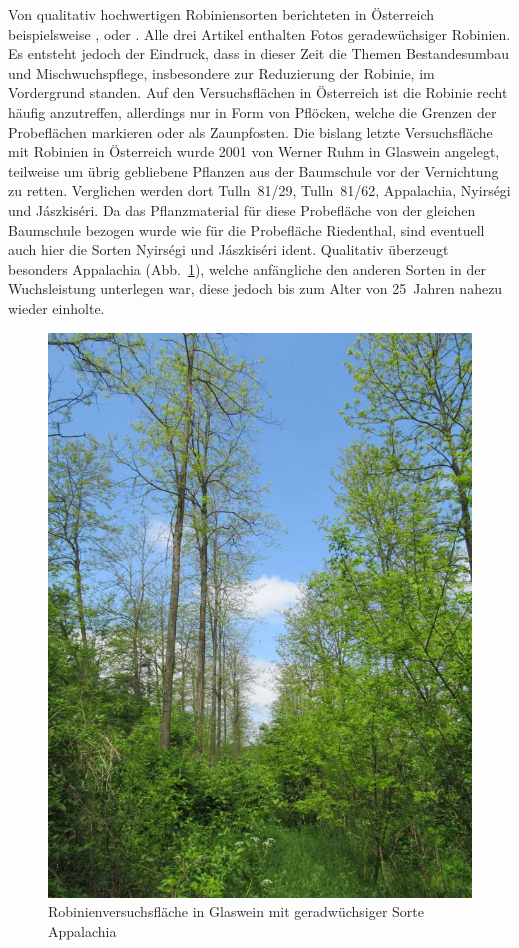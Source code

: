 \documentclass[twocolumn]{scrartcl}
\begin{document}
Von qualitativ hochwertigen Robiniensorten berichteten in Österreich
beispielsweise \citet{mueller1991robinie}, \citet{iby1998robinie} oder
\citet{demel2004robinie}. Alle drei Artikel enthalten Fotos
geradewüchsiger Robinien. Es entsteht jedoch der Eindruck, dass in
dieser Zeit die Themen Bestandesumbau und Mischwuchspflege,
insbesondere zur Reduzierung der Robinie, im Vordergrund standen.
Auf den Versuchsflächen in Österreich ist die Robinie recht
häufig anzutreffen, allerdings nur in Form von Pflöcken, welche
die Grenzen der Probeflächen markieren oder als Zaunpfosten.
Die bislang letzte Versuchsfläche mit
Robinien in Österreich wurde 2001 von Werner Ruhm in Glaswein
angelegt, teilweise um übrig gebliebene Pflanzen aus der Baumschule
vor der Vernichtung zu retten.  Verglichen werden dort Tulln~81/29,
Tulln~81/62, Appalachia, Nyirségi und Jászkiséri. Da das
Pflanzmaterial für diese Probefläche von der gleichen Baumschule
bezogen wurde wie für die Probefläche Riedenthal, sind eventuell auch
hier die Sorten Nyirségi und Jászkiséri ident. Qualitativ überzeugt
besonders Appalachia (Abb.~\ref{fig:glaswein2}), welche anfängliche
den anderen Sorten in der Wuchsleistung unterlegen war, diese jedoch
bis zum Alter von 25~Jahren nahezu wieder einholte.

\begin{figure}[htbp]
  \centering
  \includegraphics[width=.9\linewidth]{./bild/GlasweinRobinie2023b}
  \caption{Robinienversuchsfläche in Glaswein mit geradwüchsiger Sorte Appalachia}
  \label{fig:glaswein2}
\end{figure}
\end{document}
